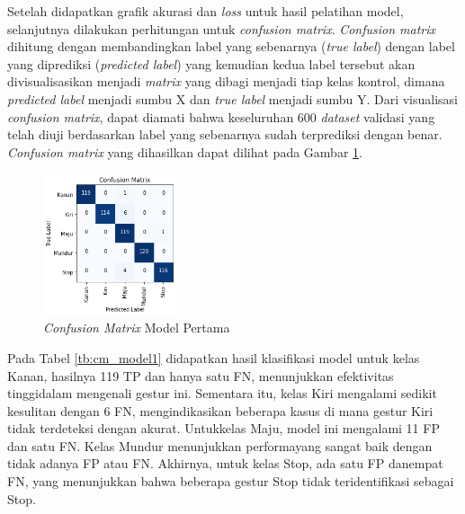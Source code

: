 Setelah didapatkan grafik akurasi dan \emph{loss} untuk hasil pelatihan model, selanjutnya dilakukan perhitungan untuk \emph{confusion matrix}. \emph{Confusion matrix} dihitung dengan membandingkan label yang sebenarnya (\emph{true label}) dengan label yang diprediksi (\emph{predicted label}) yang kemudian kedua label tersebut akan divisualisasikan menjadi \emph{matrix} yang dibagi menjadi tiap kelas kontrol, dimana \emph{predicted label} menjadi sumbu X dan \emph{true label} menjadi sumbu Y. Dari visualisasi \emph{confusion matrix}, dapat diamati bahwa keseluruhan 600 \emph{dataset} validasi yang telah diuji berdasarkan label yang sebenarnya sudah terprediksi dengan benar. \emph{Confusion matrix} yang dihasilkan dapat dilihat pada Gambar \ref{fig:matrix11}.

\begin{figure} [H] \centering
  \includegraphics[width=0.35\textwidth]{gambar/bab4/model5 (30cm)/110cm/matrix.png}
  \caption{\emph{Confusion Matrix} Model Pertama}
  \label{fig:matrix11}
\end{figure}

Pada Tabel \ref{tb:cm_model1} didapatkan hasil klasifikasi model untuk kelas Kanan, hasilnya 119 TP dan hanya satu FN, menunjukkan efektivitas tinggidalam mengenali gestur ini. Sementara itu, kelas Kiri mengalami sedikit kesulitan dengan 6 FN, mengindikasikan beberapa kasus di mana gestur Kiri tidak terdeteksi dengan akurat. Untukkelas Maju, model ini mengalami 11 FP dan satu FN. Kelas Mundur menunjukkan performayang sangat baik dengan tidak adanya FP atau FN. Akhirnya, untuk kelas Stop, ada satu FP danempat FN, yang menunjukkan bahwa beberapa gestur Stop tidak teridentifikasi sebagai Stop.

